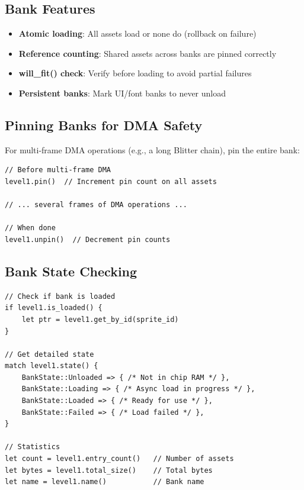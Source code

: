 \subsection{Bank Features}

\begin{itemize}
    \item \textbf{Atomic loading}: All assets load or none do (rollback on failure)
    \item \textbf{Reference counting}: Shared assets across banks are pinned correctly
    \item \textbf{will\_fit() check}: Verify before loading to avoid partial failures
    \item \textbf{Persistent banks}: Mark UI/font banks to never unload
\end{itemize}

\subsection{Pinning Banks for DMA Safety}

For multi-frame DMA operations (e.g., a long Blitter chain), pin the entire bank:

\begin{lstlisting}
// Before multi-frame DMA
level1.pin()  // Increment pin count on all assets

// ... several frames of DMA operations ...

// When done
level1.unpin()  // Decrement pin counts
\end{lstlisting}

\subsection{Bank State Checking}

\begin{lstlisting}
// Check if bank is loaded
if level1.is_loaded() {
    let ptr = level1.get_by_id(sprite_id)
}

// Get detailed state
match level1.state() {
    BankState::Unloaded => { /* Not in chip RAM */ },
    BankState::Loading => { /* Async load in progress */ },
    BankState::Loaded => { /* Ready for use */ },
    BankState::Failed => { /* Load failed */ },
}

// Statistics
let count = level1.entry_count()   // Number of assets
let bytes = level1.total_size()    // Total bytes
let name = level1.name()           // Bank name
\end{lstlisting}

